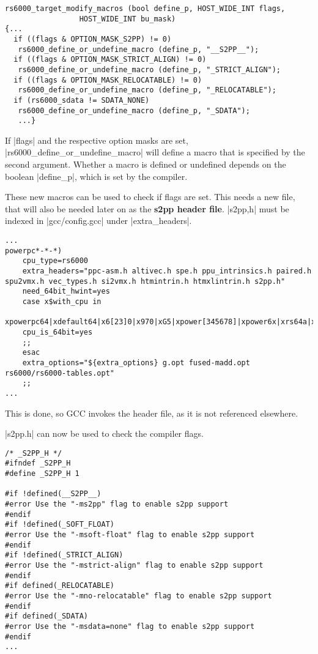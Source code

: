\begin{lstlisting}
rs6000_target_modify_macros (bool define_p, HOST_WIDE_INT flags,
                 HOST_WIDE_INT bu_mask)
{...
  if ((flags & OPTION_MASK_S2PP) != 0)
   rs6000_define_or_undefine_macro (define_p, "__S2PP__");
  if ((flags & OPTION_MASK_STRICT_ALIGN) != 0)
   rs6000_define_or_undefine_macro (define_p, "_STRICT_ALIGN");
  if ((flags & OPTION_MASK_RELOCATABLE) != 0)
   rs6000_define_or_undefine_macro (define_p, "_RELOCATABLE");
  if (rs6000_sdata != SDATA_NONE)
   rs6000_define_or_undefine_macro (define_p, "_SDATA");
   ...}
\end{lstlisting}

If |flags| and the respective option masks are set, |rs6000_define_or_undefine_macro| will define a macro that is specified by the second argument.
Whether a macro is defined or undefined depends on the boolean |define_p|, which is set by the compiler.

These new macros can be used to check if flags are set.
This needs a new file, that will also be needed later on as the \textbf{\ac{s2pp} header file}.
|s2pp,h| must be indexed in |gcc/config.gcc| under |extra_headers|.
\begin{lstlisting}
...
powerpc*-*-*)
    cpu_type=rs6000
    extra_headers="ppc-asm.h altivec.h spe.h ppu_intrinsics.h paired.h spu2vmx.h vec_types.h si2vmx.h htmintrin.h htmxlintrin.h s2pp.h"
    need_64bit_hwint=yes
    case x$with_cpu in
    xpowerpc64|xdefault64|x6[23]0|x970|xG5|xpower[345678]|xpower6x|xrs64a|xcell|xa2|xe500mc64|xe5500|Xe6500)
    cpu_is_64bit=yes
    ;;
    esac
    extra_options="${extra_options} g.opt fused-madd.opt rs6000/rs6000-tables.opt"
    ;;
...
\end{lstlisting}
This is done, so \ac{GCC} invokes the header file, as it is not referenced elsewhere.

|s2pp.h| can now be used to check the compiler flags.
\begin{lstlisting}
/* _S2PP_H */
#ifndef _S2PP_H
#define _S2PP_H 1

#if !defined(__S2PP__)
#error Use the "-ms2pp" flag to enable s2pp support
#endif
#if !defined(_SOFT_FLOAT)
#error Use the "-msoft-float" flag to enable s2pp support
#endif
#if !defined(_STRICT_ALIGN)
#error Use the "-mstrict-align" flag to enable s2pp support
#endif
#if defined(_RELOCATABLE)
#error Use the "-mno-relocatable" flag to enable s2pp support
#endif
#if defined(_SDATA)
#error Use the "-msdata=none" flag to enable s2pp support
#endif
...
\end{lstlisting}

